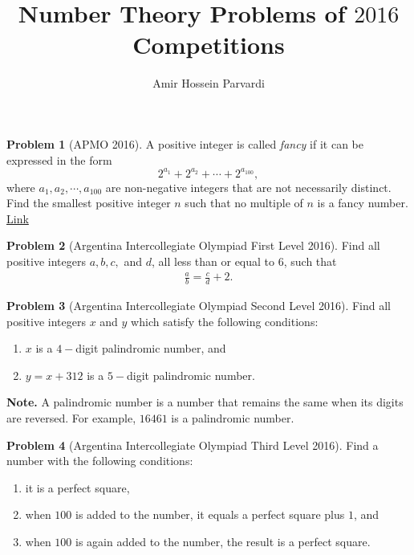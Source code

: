 \documentclass[]{article}
\title{Number Theory Problems of $2016$ Competitions}
\author{Amir Hossein Parvardi}
\theoremstyle{definition}
\newtheorem{problem}{Problem}
\begin{document}
	
\maketitle


	
\begin{problem}[APMO 2016]
	A positive integer is called \textit{fancy} if it can be expressed in the form $$2^{a_1}+2^{a_2}+ \cdots+ 2^{a_{100}},$$where $a_1,a_2, \cdots, a_{100}$ are non-negative integers that are not necessarily distinct. Find the smallest positive integer $n$ such that no multiple of $n$ is a fancy number. \flushright \href{http://artofproblemsolving.com/community/c6h1243426p6362865}{Link}
\end{problem}



\begin{problem}[Argentina Intercollegiate Olympiad First Level 2016]
	Find all positive integers $a,b,c,$ and $d$, all less than or equal to $6$, such that
		\begin{align*}
			\frac{a}{b} = \frac{c}{d} + 2.
		\end{align*}
\end{problem}



\begin{problem}[Argentina Intercollegiate Olympiad Second Level 2016]
	Find all positive integers $x$ and $y$ which satisfy the following conditions:
		\begin{enumerate}
			\item $x$ is a $4-$digit palindromic number, and
			\item $y=x+312$ is a $5-$digit palindromic number.
		\end{enumerate}
	\textbf{Note.} A palindromic number is a number that remains the same when its digits are reversed. For example, $16461$ is a palindromic number.
\end{problem}


\begin{problem}[Argentina Intercollegiate Olympiad Third Level 2016]
	Find a number with the following conditions:
		\begin{enumerate}
			\item it is a perfect square,
			\item when $100$ is added to the number, it equals a perfect square plus $1$, and
			\item when $100$ is again added to the number, the result is a perfect square.
		\end{enumerate}
\end{problem}
\end{document}
